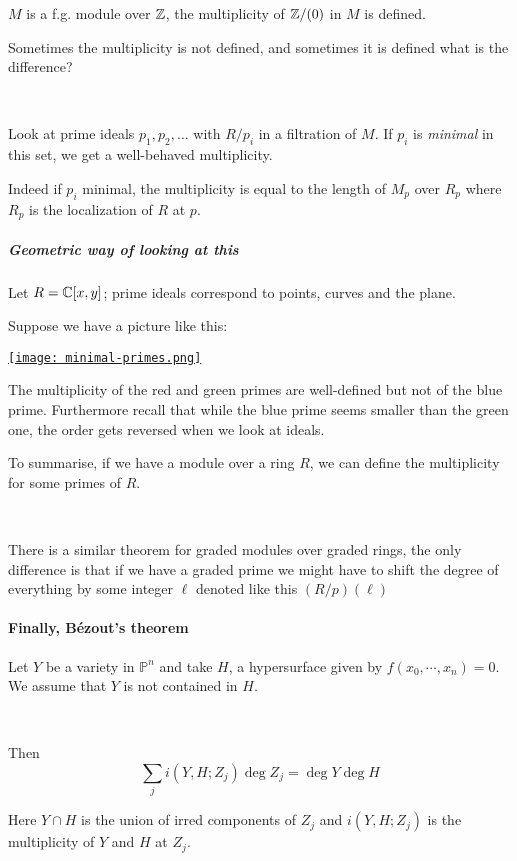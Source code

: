 \begin{example}
    $M$ is a f.g. module over $\mathbb{Z}$, the multiplicity of $\mathbb{Z}/(0)$ in $M$ is defined.
\end{example}

Sometimes the multiplicity is not defined, and sometimes it is defined what is the difference?

\
\begin{remark}
    Look at prime ideals $p_1,p_2,\ldots$ with $R/p_i$ in a filtration of $M$. If $p_i$ is \textit{minimal} in this set, we get a well-behaved multiplicity.    
\end{remark}
Indeed if $p_i$ minimal, the multiplicity is equal to the length of $M_p$ over $R_p$ where $R_p$ is the localization of $R$ at $p$. 

\subparagraph*{Geometric way of looking at this}
Let $R=\mathbb{C}[x,y]$; prime ideals correspond to points, curves and the plane.

Suppose we have a picture like this:
\begin{center}
    \href{https://youtu.be/UJssbO-e2yw?t=1194}{\texttt{[image: minimal-primes.png]}}    
\end{center}

The multiplicity of the red and green primes are well-defined but not of the blue prime. Furthermore recall that while the blue prime seems smaller than the green one, the order gets reversed when we look at ideals.

To summarise, if we have a module over a ring $R$, we can define the multiplicity for some primes of $R$. 

\

There is a similar theorem for graded modules over graded rings, the only difference is that if we have a graded prime we might have to shift the degree of everything by some integer $\ell$ denoted like this $(R/p)(\ell)$


\paragraph*{Finally, Bézout's theorem}
\begin{theorem}
    Let $Y$ be a variety in $\mathbb{P}^n$ and take $H$, a hypersurface given by $f(x_0,\cdots,x_n) = 0$. We assume that $Y$ is not contained in $H$. 

    \

    Then \[\sum_j i(Y, H; Z_j)\deg Z_j = \deg Y\deg H \tag{$\dagger$} \]

Here $Y\cap H$ is the union of irred components of $Z_j$ and $i(Y, H; Z_j)$ is the multiplicity of $Y$ and $H$ at $Z_j$. 
\end{theorem}

